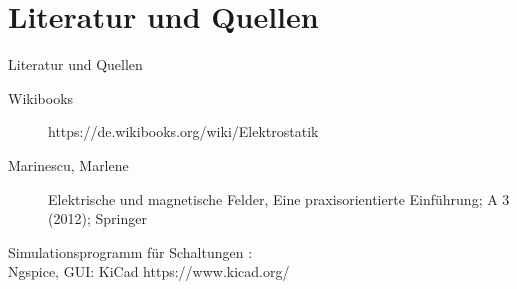 \section{Literatur und Quellen}
\begin{frame}{Literatur und Quellen}
\begin{description}
  \item[Wikibooks] https://de.wikibooks.org/wiki/Elektrostatik
  \item[Marinescu, Marlene]  Elektrische und magnetische Felder,
  Eine praxisorientierte Einführung; A 3 (2012); Springer
\end{description}
Simulationsprogramm für Schaltungen :\\Ngspice, GUI: KiCad https://www.kicad.org/
\end{frame}

  \listoffigures


